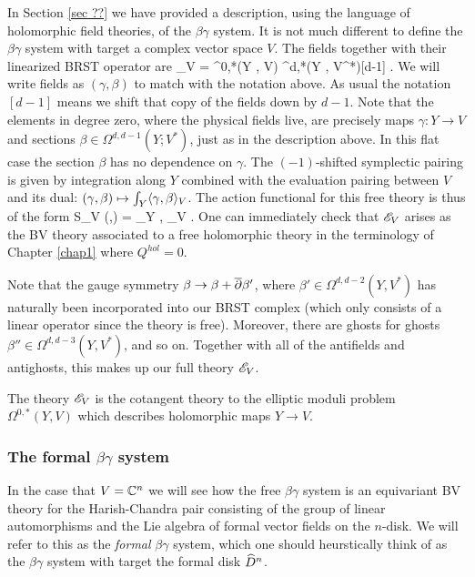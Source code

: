 In Section \ref{sec ??} we have provided a description, using the language of holomorphic field theories, of the $\beta\gamma$ system.
It is not much different to define the $\beta\gamma$ system with target a complex vector space $V$. 
The fields together with their linearized BRST operator are
\ben
\sE_V = \Omega^{0,*}(Y , V) \oplus \Omega^{d,*}(Y , V^*)[d-1] .
\een
We will write fields as $(\gamma,\beta)$ to match with the notation above.
As usual the notation $[d-1]$ means we shift that copy of the fields down by $d-1$. 
Note that the elements in degree zero, where the physical fields live, are precisely maps $\gamma : Y \to V$ and sections $\beta \in\Omega^{d,d-1} (Y ; V^*)$, just as in the description above. 
In this flat case the section $\beta$ has no dependence on $\gamma$.
The $(-1)$-shifted symplectic pairing is given by integration along $Y$ combined with the evaluation pairing between $V$ and its dual: $(\gamma, \beta) \mapsto \int_Y \langle\gamma, \beta\rangle_V$. 
The action functional for this free theory is thus of the form
\ben
S_V (\beta,\gamma) = \int_Y \<\beta, \dbar \gamma\>_{V} .
\een
One can immediately check that $\mathscr E_V$ arises as the BV theory associated to a free holomorphic theory in the terminology of Chapter \ref{chap1} where $Q^{hol} = 0$. 

Note that the gauge symmetry $\beta \to \beta + \overline{\partial} \beta'$, where $\beta' \in \Omega^{d,d-2} (Y, V^*)$ has naturally been incorporated into our BRST complex (which only consists of a linear operator since the theory is free). 
Moreover, there are ghosts for ghosts $\beta'' \in \Omega^{d,d-3}(Y , V^*)$, and so on.
Together with all of the antifields and antighosts, this makes up our full theory $\mathscr E_V$. 

The theory $\mathscr E_V$ is the cotangent theory to the elliptic moduli problem $\Omega^{0,*}(Y, V)$ which describes holomorphic maps $Y \to V$.

\subsubsection{The formal $\beta\gamma$ system}

In the case that $V = \mathbb C^n$ we will see how the free $\beta\gamma$ system is an equivariant BV theory for the Harish-Chandra pair consisting of the group of linear automorphisms and the Lie algebra of formal vector fields on the $n$-disk.
We will refer to this as the {\em formal} $\beta\gamma$ system, which one should heurstically think of as the $\beta\gamma$ system with target the formal disk $\widehat{D}^n$.

